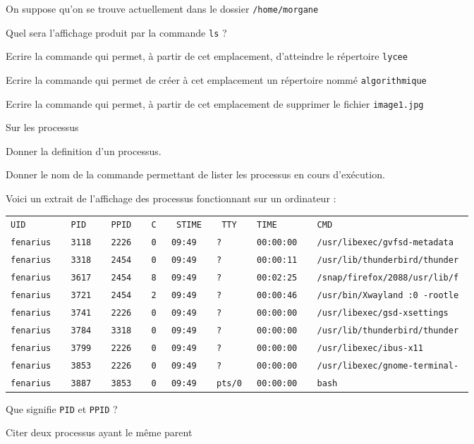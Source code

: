 \documentclass[11pt,a4paper]{article}
\begin{document}
On suppose qu'on se trouve actuellement dans le dossier {\tt /home/morgane}
\SQListe
\item Quel sera l'affichage produit par la commande {\tt ls} ?
\item Ecrire la commande qui permet, à partir de cet emplacement, d'atteindre le répertoire {\tt lycee}
\item Ecrire la commande qui permet de créer à cet emplacement un répertoire nommé {\tt algorithmique}
\item Ecrire la commande qui permet, à partir de cet emplacement de supprimer le fichier {\tt image1.jpg}
\FinListe
\item Sur les processus
\SQListe
\item Donner la definition d'un processus.
\item Donner le nom de la commande permettant de lister les processus en cours d'exécution.
\item  Voici un extrait de l'affichage des processus fonctionnant sur un ordinateur : \\
\begin{tabular}{>{\tt}l>{\tt}l>{\tt}l>{\tt}l>{\tt}l>{\tt}l>{\tt}l>{\tt}l}
UID & PID & PPID & C & STIME & TTY & TIME & CMD \\ 
fenarius &   3118 &   2226 & 0 &09:49 &?    &    00:00:00 & /usr/libexec/gvfsd-metadata \\
fenarius &   3318 &   2454 & 0 &09:49 &?    &    00:00:11 & /usr/lib/thunderbird/thunder \\
fenarius &   3617 &   2454 & 8 &09:49 &?    &    00:02:25 & /snap/firefox/2088/usr/lib/f \\
fenarius &   3721 &   2454 & 2 &09:49 &?    &    00:00:46 & /usr/bin/Xwayland :0 -rootle \\
fenarius &   3741 &   2226 & 0 &09:49 &?    &    00:00:00 & /usr/libexec/gsd-xsettings \\
fenarius &   3784 &   3318 & 0 &09:49 &?    &    00:00:00 & /usr/lib/thunderbird/thunder \\
fenarius &   3799 &   2226 & 0 &09:49 &?    &    00:00:00 & /usr/libexec/ibus-x11 \\
fenarius &   3853 &   2226 & 0 &09:49 &?    &    00:00:00 & /usr/libexec/gnome-terminal- \\
fenarius &   3887 &   3853 & 0 &09:49 &pts/0&    00:00:00 & bash \\
\end{tabular}
\item Que signifie {\tt PID} et {\tt PPID} ?
\item Citer deux processus ayant le même parent
\end{document}
